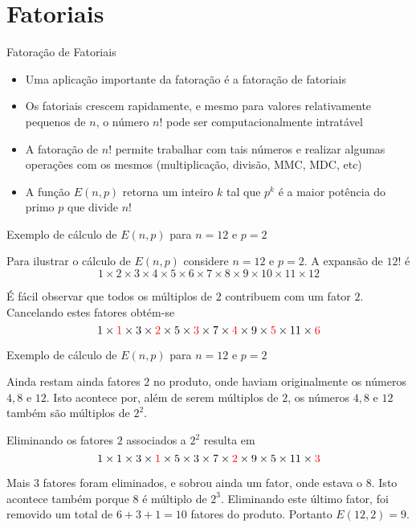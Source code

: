\section{Fatoriais}

\begin{frame}[fragile]{Fatoração de Fatoriais}

    \begin{itemize}
        \item Uma aplicação importante da fatoração é a fatoração de fatoriais

        \item Os fatoriais crescem rapidamente, e mesmo para valores relativamente pequenos de $n$, 
            o número $n!$ pode ser computacionalmente intratável

        \item A fatoração de $n!$ permite trabalhar com tais números e realizar algumas operações 
            com os mesmos (multiplicação, divisão, MMC, MDC, etc)

        \item A função $E(n,p)$ retorna um inteiro $k$ tal que $p^k$ é a maior potência do primo 
            $p$ que divide $n!$
    \end{itemize}

\end{frame}

\begin{frame}[fragile]{Exemplo de cálculo de $E(n, p)$ para $n = 12$ e $p = 2$}

Para ilustrar o cálculo de $E(n,p)$ considere $n = 12$ e $p = 2$. A expansão de $12!$ é 
$$
        1 \times 2 \times 3 \times 4 \times 5 \times 6 \times 7 \times 8 \times 9 \times 10 \times 11 \times 12
$$

É fácil observar que todos os múltiplos de $2$ contribuem com um fator $2$. Cancelando estes fatores obtém-se
$$
        1 \times \textcolor{red}{1} \times 3 \times \textcolor{red}{2} \times 5 \times \textcolor{red}{3} \times 7 \times \textcolor{red}{4} \times 9 \times \textcolor{red}{5} \times 11 \times \textcolor{red}{6}
$$

\end{frame}

\begin{frame}[fragile]{Exemplo de cálculo de $E(n, p)$ para $n = 12$ e $p = 2$}

Ainda restam ainda fatores $2$ no produto, onde haviam originalmente os números $4, 8$ e $12$. Isto acontece por, além de serem múltiplos de $2$, os números $4, 8$ e $12$ também são múltiplos de $2^2$. 

Eliminando os fatores $2$ associados a $2^2$ resulta em
$$
        1 \times 1 \times 3 \times \textcolor{red}{1} \times 5 \times 3 \times 7 \times \textcolor{red}{2} \times 9 \times 5 \times 11 \times \textcolor{red}{3}
$$

Mais $3$ fatores foram eliminados, e sobrou ainda um fator, onde estava o $8$. Isto acontece também porque 8 é múltiplo de $2^3$. Eliminando este último fator, foi removido um total de $6 + 3 + 1 = 10$ fatores do produto.  Portanto $E(12,2) = 9$.

\end{frame}

